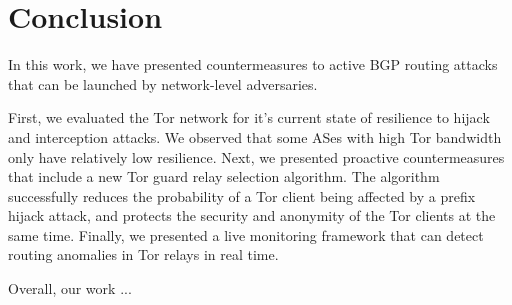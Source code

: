 \section{Conclusion}

In this work, we have presented countermeasures to active BGP routing attacks that can be launched by network-level adversaries. 

First, we evaluated the Tor network for it's current state of resilience to hijack and interception attacks.  
We observed that some ASes with high Tor bandwidth only have relatively low resilience.  Next, we presented proactive countermeasures that include a new Tor guard relay selection algorithm. The algorithm successfully reduces the probability of a Tor client being affected by a prefix hijack attack, and protects the security and anonymity of the Tor clients at the same time. Finally, we presented a live monitoring framework that can detect routing anomalies in Tor relays in real time. 

Overall, our work ...